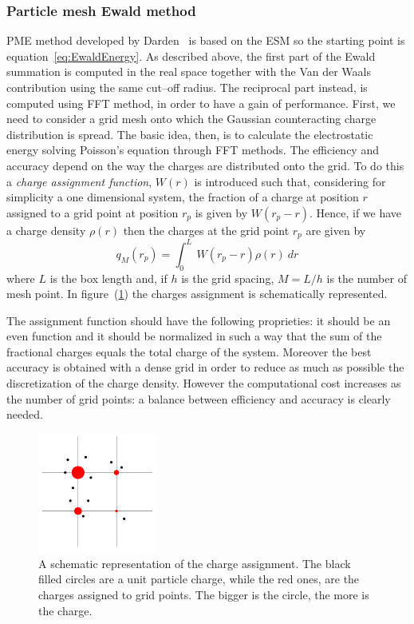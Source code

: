 \subsubsection{Particle mesh Ewald method}
\acf{PME} method developed by Darden \etal\, \cite{DardenPME} is based on the \ac{ESM} so the starting point is 
equation~\eqref{eq:EwaldEnergy}. As described above, the first part of the Ewald summation is computed in the 
real space together with the Van der Waals contribution using the same cut--off radius. The reciprocal part 
instead, is computed using \ac{FFT} method, in order to have a gain of performance. First, we need to 
consider a grid mesh onto which the Gaussian counteracting charge distribution is spread. The basic idea, then, 
is to calculate the electrostatic energy solving Poisson's equation through \ac{FFT} methods. The efficiency and 
accuracy depend on the way the charges are distributed onto the grid. To do this a \textit{charge assignment 
function}, $W(r)$ is introduced such that, considering for simplicity a one dimensional system, the fraction of a 
charge at position $r$ assigned to a grid point at position $r_p$ is given by $W(r_p - r)$. Hence, if we have a 
charge density $\rho(r)$ then the charges at the grid point $r_p$ are given by
\begin{equation}
	q_M(r_p) = \int_0^L\ W(r_p - r) \rho (r)\ dr
	\label{eq:meshAssign}
\end{equation}
where $L$ is the box length and, if $h$ is the grid spacing, $M = L/h$ is the number of mesh point. In 
figure~(\ref{fig:gidAssign}) the charges assignment is schematically represented. 

The assignment function should have the following proprieties: it should be an even function and it should be 
normalized in such a way that the sum of the fractional charges equals the total charge of the system. Moreover 
the best accuracy is obtained with a dense grid in order to reduce as much as possible the discretization of the 
charge density. However the computational cost increases as the number of grid points: a balance between 
efficiency and accuracy is clearly needed.
\begin{figure}
	\includegraphics[width=0.35\textwidth]{./img/gridCharge/gridCharge}
	\caption{A schematic representation of the charge assignment. The black filled circles are a unit particle charge, while the red ones, are the charges assigned to grid points. The bigger is the circle, the more is the charge.}
	\label{fig:gidAssign}
\end{figure}

